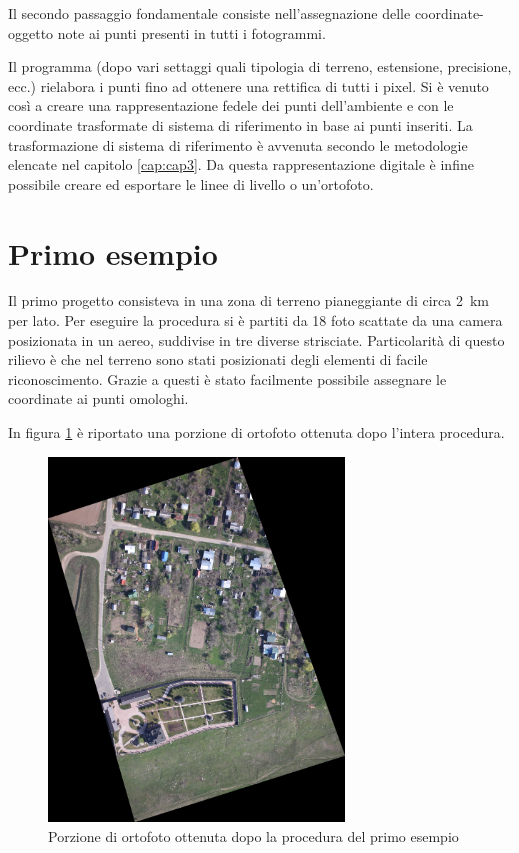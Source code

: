 Il secondo passaggio fondamentale consiste nell'assegnazione delle coordinate-oggetto note ai punti presenti in tutti i fotogrammi.

Il programma (dopo vari settaggi quali tipologia di terreno, estensione, precisione, ecc.) rielabora i punti fino ad ottenere una rettifica di tutti i pixel.
Si è venuto così a creare una rappresentazione fedele dei punti dell'ambiente e con le coordinate trasformate di sistema di riferimento  in base ai punti inseriti.
La trasformazione di sistema di riferimento è avvenuta secondo le metodologie elencate nel capitolo \ref{cap:cap3}.
Da questa rappresentazione digitale è infine  possibile creare ed esportare le linee di livello o un'ortofoto.
\section{Primo esempio}
Il primo progetto consisteva in una zona di terreno pianeggiante di circa \SI{2}{\kilo\meter} per lato.  
Per eseguire la procedura si è partiti da 18 foto scattate da una camera posizionata in un aereo, suddivise in tre diverse strisciate.
Particolarità di questo rilievo è che nel terreno sono stati posizionati degli elementi di facile riconoscimento.
Grazie a questi è stato facilmente possibile assegnare le coordinate ai punti omologhi.

In figura \ref{orto1} è riportato una porzione di ortofoto ottenuta dopo l'intera procedura. 
\begin{figure}[htbp]
\centering
\includegraphics[trim= 3cm 3cm 3cm 3cm,clip,width=0.7\textwidth]{Img/Orto1.pdf}
\caption{Porzione di ortofoto ottenuta dopo la procedura del primo esempio}
\label{orto1}
\end{figure}
